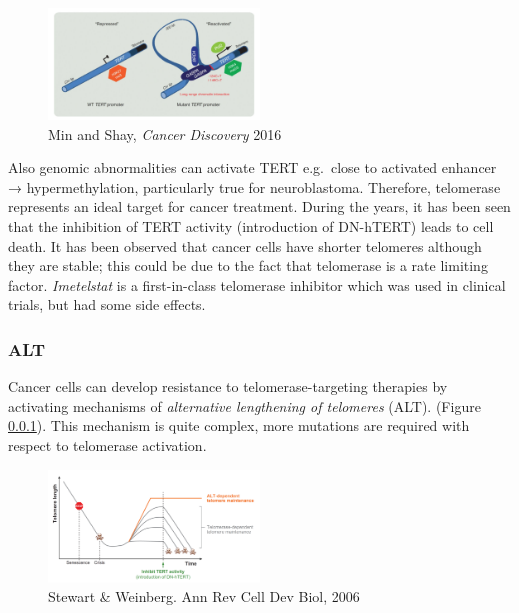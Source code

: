 \begin{figure}
\centering
\includegraphics[width=0.5\textwidth]{../_resources/Screen_Shot_2022-12-17_at_17-53-38.png}
\caption{Min and Shay, \emph{Cancer Discovery} 2016}
\end{figure}

Also genomic abnormalities can activate TERT e.g.~close to activated
enhancer → hypermethylation, particularly true for neuroblastoma.
Therefore, telomerase represents an ideal target for cancer treatment.
During the years, it has been seen that the inhibition of TERT activity
(introduction of DN-hTERT) leads to cell death. It has been observed
that cancer cells have shorter telomeres although they are stable; this
could be due to the fact that telomerase is a rate limiting factor.
\emph{Imetelstat} is a first-in-class telomerase inhibitor which was
used in clinical trials, but had some side effects.

\hypertarget{alt}{%
\subsubsection{ALT}\label{alt}}

Cancer cells can develop resistance to telomerase-targeting therapies by
activating mechanisms of \emph{alternative lengthening of telomeres}
(ALT). (Figure \ref{alt}). This mechanism is quite complex, more mutations are required with
respect to telomerase activation.

\begin{figure}
\centering
\includegraphics[width=0.5\textwidth]{../_resources/Screen_Shot_2022-12-17_at_17-44-43.png}
\caption{Stewart \& Weinberg. Ann Rev Cell Dev Biol, 2006}
\label{fig:alt}
\end{figure}

